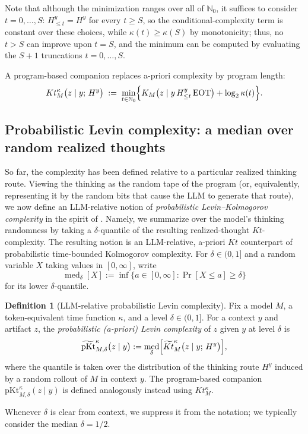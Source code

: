 \documentclass[letterpaper]{article} %
\theoremstyle{definition}
\newtheorem{definition}[theorem]{Definition}
\theoremstyle{remark}
\newcommand{\EOT}{\mathrm{EOT}}
\DeclareMathOperator{\med}{med}
\newcommand{\pKt}{\mathrm{pKt}}
\newcommand{\pKtt}{\widetilde{\pKt}}
\begin{document}
Note that although the minimization ranges over all of \(\mathbb N_0\), it
suffices to consider \(t=0,\ldots,S\):
\(H^y_{\leq t}=H^y\) for every \(t\geq S\), so the conditional-complexity
term is constant over these choices, while
\(\kappa(t)\geq\kappa(S)\) by monotonicity; thus, no \(t>S\) can improve
upon \(t=S\), and the minimum can be computed by evaluating the \(S+1\)
truncations \(t=0,\ldots,S\).

A program-based companion replaces a-priori complexity by program length:
\[
Kt^{\kappa}_M\bigl(z \mid y;\, H^y\bigr)
\;:=\;
\min_{t \in \mathbb N_0}
\Bigl\{ K_M\bigl(z \mid y\, H^y_{\le t}\, \EOT\bigr) + \log_2 \kappa(t) \Bigr\}.
\]

\subsection{Probabilistic Levin complexity: a median over random realized thoughts}\label{sec:pkt}
So far, the complexity has been defined relative to a particular realized
thinking route. Viewing the thinking as the random tape of the program (or,
equivalently, representing it by the random bits that cause the LLM to
generate that route), we now define an LLM-relative notion of
\emph{probabilistic Levin--Kolmogorov complexity} in the spirit of
\cite{GKLO22}. Namely, we summarize over the model's thinking randomness by
taking a $\delta$-quantile of the resulting realized-thought $Kt$-complexity. The resulting notion is an LLM-relative, a-priori $Kt$ counterpart of probabilistic time-bounded Kolmogorov complexity.
%
For \(\delta\in(0,1]\) and a random variable \(X\) taking values in
\([0,\infty]\), write
\[
\med_{\delta}[X]
:=
\inf\{a\in[0,\infty]:\Pr[X\leq a]\geq\delta\}
\]
for its lower \(\delta\)-quantile.

\begin{definition}[LLM-relative probabilistic Levin complexity]
\label{def:pkt}
Fix a model \(M\), a token-equivalent time function \(\kappa\), and a level
\(\delta\in(0,1]\). For a context \(y\) and artifact \(z\), the
\emph{probabilistic (a-priori) Levin complexity} of \(z\) given \(y\) at level
\(\delta\) is
\begin{equation}\label{eq:pktdef}
\pKtt^{\kappa}_{M,\delta}\bigl(z\mid y\bigr)
:=
\med_{\delta}\Bigl[
\widetilde{Kt}^{\kappa}_M\bigl(z\mid y;\,H^y\bigr)
\Bigr],
\end{equation}
where the quantile is taken over the distribution of the thinking route
\(H^y\) induced by a random rollout of \(M\) in context \(y\).
The
program-based companion \(\pKt^{\kappa}_{M,\delta}(z\mid y)\) is defined
analogously instead using \(Kt^{\kappa}_M\).
\end{definition}
Whenever $\delta$ is clear from context, we suppress it from the notation; we
typically consider the median $\delta=1/2$. 
\end{document}
